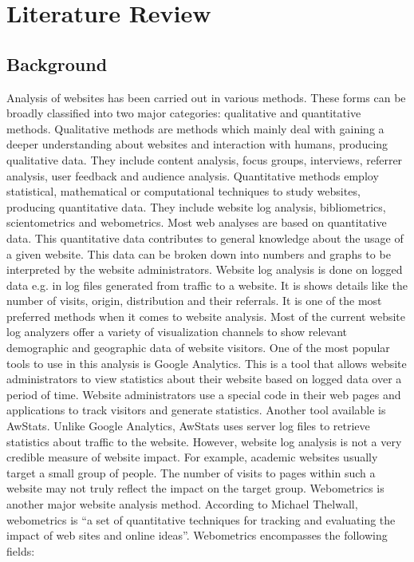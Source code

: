 \chapter{Literature Review}
\section{Background}
Analysis of websites has been carried out in various methods. These forms can be broadly classified into two major categories: qualitative and quantitative methods. Qualitative methods are methods which mainly deal with gaining a deeper understanding about websites and interaction with humans, producing qualitative data. They include content analysis, focus groups, interviews, referrer analysis, user feedback and audience analysis. Quantitative methods employ statistical, mathematical or computational techniques to study websites, producing quantitative data. They include website log analysis, bibliometrics, scientometrics and webometrics.
Most web analyses are based on quantitative data. This quantitative data contributes to general knowledge about the usage of a given website. This data can be broken down into numbers and graphs to be interpreted by the website administrators. 
Website log analysis is done on logged data e.g. in log files generated from traffic to a website. It is shows details like the number of visits, origin, distribution and their referrals. It is one of the most preferred methods when it comes to website analysis. Most of the current website log analyzers offer a variety of visualization channels to show relevant demographic and geographic data of website visitors. One of the most popular tools to use in this analysis is Google Analytics. This is a tool that allows website administrators to view statistics about their website based on logged data over a period of time. Website administrators use a special code in their web pages and applications to track visitors and generate statistics. Another tool available is AwStats. Unlike Google Analytics, AwStats uses server log files to retrieve statistics about traffic to the website.
However, website log analysis is not a very credible measure of website impact. For example, academic websites usually target a small group of people. The number of visits to pages within such a website may not truly reflect the impact on the target group. 
Webometrics is another major website analysis method. According to Michael Thelwall, webometrics is “a set of quantitative techniques for tracking and evaluating the impact of web sites and online ideas”. Webometrics encompasses the following fields:
